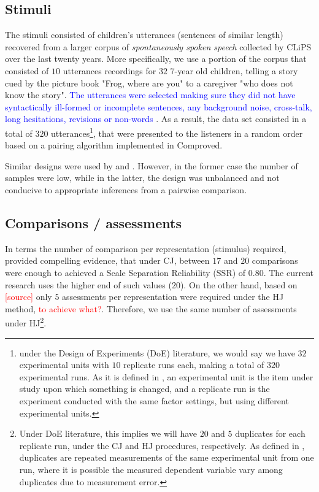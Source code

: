 \subsection{Stimuli}
%
The stimuli consisted of children's utterances (sentences of similar length) recovered from a larger corpus of \textit{spontaneously spoken speech} collected by CLiPS over the last twenty years. More specifically, we use a portion of the corpus that consisted of $10$ utterances recordings for $32$ 7-year old children, telling a story cued by the picture book "Frog, where are you" \citep{Mayer_1969} to a caregiver "who does not know the story". \textcolor{blue}{The utterances were selected making sure they did not have syntactically ill-formed or incomplete sentences, any background noise, cross-talk, long hesitations, revisions or non-words \citep{Boonen_et_al_2021}}. As a result, the data set consisted in a total of $320$ utterances\footnote{under the Design of Experiments (DoE) literature, we would say we have $32$ experimental units with $10$ replicate runs each, making a total of $320$ experimental runs. As it is defined in \citet{Lawson_2015}, an experimental unit is the item under study upon which something is changed, and a replicate run is the experiment conducted with the same factor settings, but using different experimental units.}, that were presented to the listeners in a random order based on a pairing algorithm implemented in Comproved.

Similar designs were used by \citet{Boonen_et_al_2020} and \citet{Faes_et_al_2021}. However, in the former case the number of samples were low, while in the latter, the design was unbalanced and not conducive to appropriate inferences from a pairwise comparison.
%
%
\subsection{Comparisons / assessments}
%
In terms the number of comparison per representation (stimulus) required, \citet{Verhavert_2018} provided compelling evidence, that under CJ, between $17$ and $20$ comparisons were enough to achieved a Scale Separation Reliability (SSR) of $0.80$. The current research uses the higher end of such values ($20$). On the other hand, based on \textcolor{red}{[source]} only $5$ assessments per representation were required under the HJ method, \textcolor{red}{to achieve what?}. Therefore, we use the same number of assessments under HJ\footnote{Under DoE literature, this implies we will have $20$ and $5$ duplicates for each replicate run, under the CJ and HJ procedures, respectively. As defined in \citet{Lawson_2015}, duplicates are repeated measurements of the same experimental unit from one run, where it is possible the measured dependent variable vary among duplicates due to measurement error.}.
%
%
